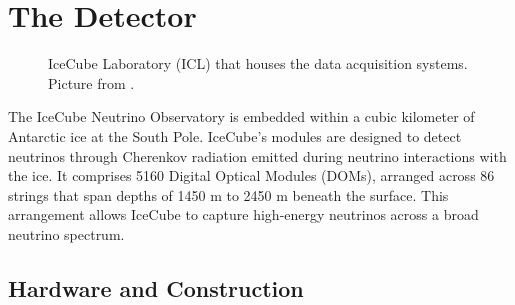 \section{The Detector}
\begin{figure}
    \caption{IceCube Laboratory (ICL) that houses the data acquisition systems. Picture from \cite{IceCube_SPGallery}.}
    \label{fig:ICL}
\end{figure}

The IceCube Neutrino Observatory is embedded within a cubic kilometer of Antarctic ice at the South Pole.
IceCube's modules are designed to detect neutrinos through Cherenkov radiation emitted during neutrino interactions with the ice.
It comprises 5160 Digital Optical Modules (DOMs), arranged across 86 strings that span depths of 1450 m to 2450 m beneath the surface.
This arrangement allows IceCube to capture high-energy neutrinos across a broad neutrino spectrum.

\subsection{Hardware and Construction}


